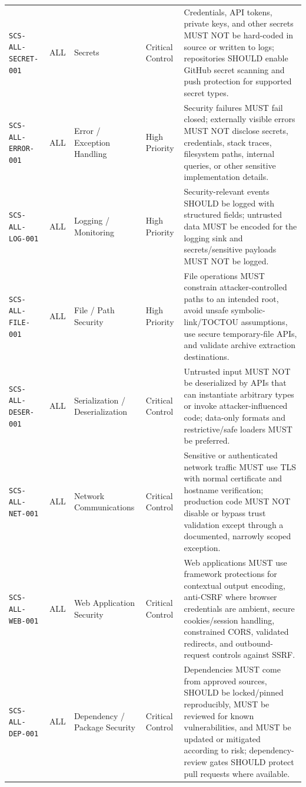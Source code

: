 \documentclass[10pt,letterpaper]{article}
\newcommand{\code}[1]{\begingroup\small\ttfamily\def\UrlFont{\ttfamily}\nolinkurl{#1}\endgroup}
\begin{document}
\begin{landscape}
\begin{longtable}{@{}P{1.3in}P{0.8in}P{1.45in}P{1.0in}P{4.65in}@{}}
\code{SCS-ALL-SECRET-001} & ALL & Secrets & Critical Control & Credentials, API tokens, private keys, and other secrets MUST NOT be hard-coded in source or written to logs; repositories SHOULD enable GitHub secret scanning and push protection for supported secret types.\\
\code{SCS-ALL-ERROR-001} & ALL & Error / Exception Handling & High Priority & Security failures MUST fail closed; externally visible errors MUST NOT disclose secrets, credentials, stack traces, filesystem paths, internal queries, or other sensitive implementation details.\\
\code{SCS-ALL-LOG-001} & ALL & Logging / Monitoring & High Priority & Security-relevant events SHOULD be logged with structured fields; untrusted data MUST be encoded for the logging sink and secrets/sensitive payloads MUST NOT be logged.\\
\code{SCS-ALL-FILE-001} & ALL & File / Path Security & High Priority & File operations MUST constrain attacker-controlled paths to an intended root, avoid unsafe symbolic-link/TOCTOU assumptions, use secure temporary-file APIs, and validate archive extraction destinations.\\
\code{SCS-ALL-DESER-001} & ALL & Serialization / Deserialization & Critical Control & Untrusted input MUST NOT be deserialized by APIs that can instantiate arbitrary types or invoke attacker-influenced code; data-only formats and restrictive/safe loaders MUST be preferred.\\
\code{SCS-ALL-NET-001} & ALL & Network Communications & Critical Control & Sensitive or authenticated network traffic MUST use TLS with normal certificate and hostname verification; production code MUST NOT disable or bypass trust validation except through a documented, narrowly scoped exception.\\
\code{SCS-ALL-WEB-001} & ALL & Web Application Security & Critical Control & Web applications MUST use framework protections for contextual output encoding, anti-CSRF where browser credentials are ambient, secure cookies/session handling, constrained CORS, validated redirects, and outbound-request controls against SSRF.\\
\code{SCS-ALL-DEP-001} & ALL & Dependency / Package Security & Critical Control & Dependencies MUST come from approved sources, SHOULD be locked/pinned reproducibly, MUST be reviewed for known vulnerabilities, and MUST be updated or mitigated according to risk; dependency-review gates SHOULD protect pull requests where available.\\

\end{longtable}
\end{landscape}
\end{document}
